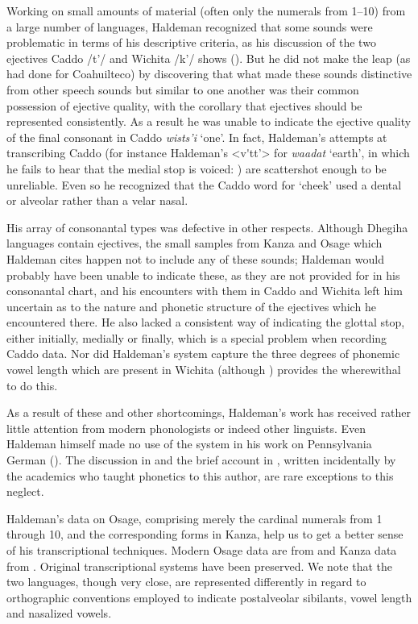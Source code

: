 \documentclass[output=paper]{LSP/langsci}
\begin{document}
Working on small amounts of material (often only the numerals from 1--10) from a large number of languages, Haldeman recognized that some sounds were problematic in terms of his descriptive criteria, as his discussion of the two ejectives  Caddo /t'/ and Wichita /k'/ shows (\citealt[3, \S448; 131, \S574]{Haldeman1860}).  But he did not make the leap (as \citealt{Garcia1760} had done for Coahuilteco) by discovering that what made these sounds distinctive from other speech sounds but similar to one another was their common possession of ejective quality, with the corollary that ejectives should be represented consistently.  As a result he was unable to indicate the ejective quality of the final consonant in Caddo \textit{wists'i} `one'.  In fact, Haldeman's attempts at transcribing Caddo (for instance Haldeman's <v\'{}tt'> for \textit{waadat} `earth', in which he fails to hear that the medial stop is voiced: \citealt[3, \S633]{Haldeman1860}) are scattershot enough to be unreliable. Even so he recognized that the Caddo word for `cheek'  used a dental or alveolar rather than a velar nasal.    

His array of consonantal types was defective in other respects. Although Dhegiha languages contain ejectives, the small samples from Kanza and Osage which Haldeman cites happen not to include any of these sounds; Haldeman would probably have been unable to indicate these, as they are not provided for in his consonantal chart, and his encounters with them in Caddo and Wichita left him uncertain as to the nature and phonetic structure of the ejectives which he encountered there.  He also lacked a consistent way of indicating the glottal stop, either initially, medially or finally, which is a special problem when recording Caddo data. Nor did Haldeman's system capture the three degrees of phonemic vowel length which are present in Wichita (although \citealt[3, \S353--355]{Haldeman1860}) provides the wherewithal to do this.  

As a result of these and other shortcomings, Haldeman's work has received rather little attention from modern phonologists or indeed other linguists.  Even Haldeman himself made no use of the system in his work on Pennsylvania German (\citealt{Haldeman1872}).  The discussion in \citet{Pilling1887} and the brief account in \citet{KellyLocal1989}, written incidentally by the academics who taught phonetics to this author, are  rare exceptions to this neglect.   

Haldeman's data on Osage, comprising merely the cardinal numerals from 1 through 10, and the corresponding forms in Kanza, help us to get a better sense of his transcriptional techniques. Modern Osage data are from \citet{Quintero2009} and Kanza data from \citet{CumberlandRankin2012}.  Original transcriptional systems have been preserved. We note that the two languages, though very close, are represented differently in regard to orthographic conventions employed to indicate postalveolar sibilants, vowel length and nasalized vowels. 
\end{document}
